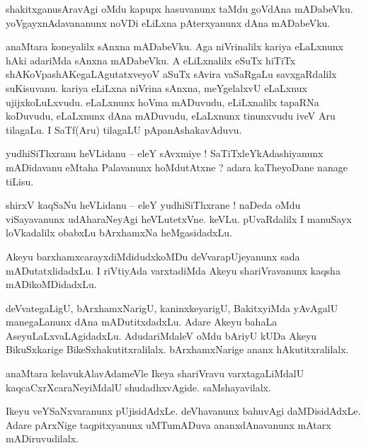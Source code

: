 \documentclass{article}
\begin{document}
\begin{mn}%
shakitxganusAravAgi oMdu kapupx hasuvanunx taMdu goVdAna mADabeVku. yoVgayxnAdavananunx noVDi 
eLiLxna pAterxyanunx dAna mADabeVku.
\end{mn}

\begin{mn}%
anaMtara koneyalilx sAnxna mADabeVku. Aga niVrinalilx kariya eLaLxnunx hAki adariMda sAnxna 
mADabeVku. A eLiLxnalilx eSuTx hiTiTx shAKoVpashAKegaLAgutatxveyoV aSuTx sAvira vaSaRgaLu 
savxgaRdalilx suKisuvanu. kariya eLiLxna niVrina sAnxna, meYgelalxvU eLaLxnux ujijxkoLuLxvudu. 
eLaLxnunx hoVma mADuvudu, eLiLxnalilx tapaRNa koDuvudu, eLaLxnunx dAna mADuvudu, eLaLxnunx 
tinunxvudu iveV Aru tilagaLu. I SaTf(Aru) tilagaLU pApanAshakavAduvu.
\end{mn}

\begin{mn}%
yudhiSiThxranu heVLidanu -- eleY sAvxmiye ! SaTiTxleYkAdashiyanunx mADidavanu eMtaha Palavanunx 
hoMdutAtxne ? adara kaTheyoDane nanage tiLisu.
\end{mn}

\begin{mn}%
shirxV kaqSaNu heVLidanu -- eleY yudhiSiThxrane ! naDeda oMdu viSayavanunx udAharaNeyAgi 
heVLutetxVne. keVLu. pUvaRdalilx I manuSayx loVkadalilx obabxLu bArxhamxNa heMgasidadxLu.
\end{mn}

\begin{mn}%
Akeyu barxhamxcarayxdiMdidudxkoMDu deVvarapUjeyanunx sada mADutatxlidadxLu. I riVtiyAda varxtadiMda 
Akeyu shariVravanunx kaqsha mADikoMDidadxLu.
\end{mn}

\begin{mn}%
deVvategaLigU, bArxhamxNarigU, kaninxkeyarigU, BakitxyiMda yAvAgalU manegaLanunx dAna 
mADutitxdadxLu. Adare Akeyu bahaLa AseyuLaLxvaLAgidadxLu. AdudariMdaleV oMdu bAriyU kUDa Akeyu 
BikuSxkarige BikeSxhakutitxralilalx. bArxhamxNarige ananx hAkutitxralilalx.
\end{mn}

\begin{mn}%
anaMtara kelavukAlavAdameVle Ikeya shariVravu varxtagaLiMdalU kaqcaCxrXcaraNeyiMdalU 
shudadhxvAgide. saMshayavilalx.
\end{mn}

\begin{mn}%
Ikeyu veYSaNxvaranunx pUjisidAdxLe. deVhavanunx bahuvAgi daMDisidAdxLe. Adare pArxNige 
taqpitxyanunx uMTumADuva ananxdAnavanunx mAtarx mADiruvudilalx.
\end{mn}
\end{document}
